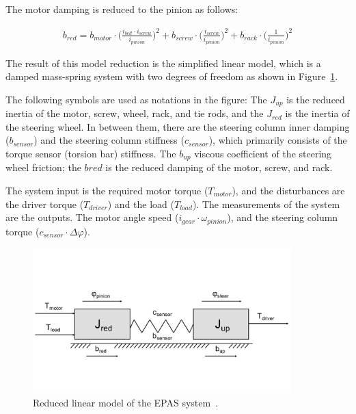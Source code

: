 The motor damping is reduced to the pinion as follows:

\begin{align}
	b_{red} 
	= b_{motor} \cdot \Bigg(\frac{i_{belt} \cdot i_{screw}}{i_{pinion}}\Bigg)^{2}
	+ b_{screw} \cdot \Bigg(\frac{i_{screw}}{i_{pinion}}\Bigg)^{2} 
	+ b_{rack} \cdot \Bigg(\frac{1}{i_{pinion}}\Bigg)^{2}
\end{align}

The result of this model reduction is the simplified linear model, which is a damped mass-spring system with two degrees of freedom as shown in Figure~\ref{fig_red_lin_model}.

The following symbols are used as notations in the figure: The $J_{up}$ is the reduced inertia of the motor, screw, wheel, rack, and tie rods, and the $J_{red}$ is the inertia of the steering wheel. In between them, there are the steering column inner damping ($b_{sensor}$) and the steering column stiffness ($c_{sensor}$), which primarily consists of the torque sensor (torsion bar) stiffness. The $b_{up}$ viscous coefficient of the steering wheel friction; the $b{red}$ is the reduced damping of the motor, screw, and rack.

The system input is the required motor torque ($T_{motor}$), and the disturbances are the driver torque ($T_{driver}$) and the load ($T_{load}$). The measurements of the system are the outputs. The motor angle speed ($i_{gear} \cdot \omega_{pinion}$), and the steering column torque ($c_{sensor} \cdot \Delta \varphi$).

\begin{figure}[b]
	\begin{center}
		\includegraphics[width=100mm]{figures/red_lin_model.png}
		\caption{Reduced linear model of the EPAS 
		system~\citep{paholics2006epas}.}
		\label{fig_red_lin_model}
	\end{center}
\end{figure}

